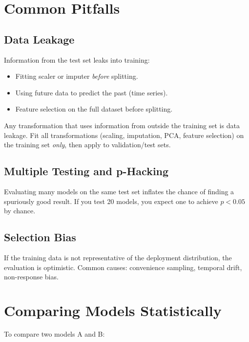 \section{Common Pitfalls}

\subsection{Data Leakage}

Information from the test set leaks into training:

\begin{itemize}
	\item Fitting scaler or imputer \emph{before} splitting.
	\item Using future data to predict the past (time series).
	\item Feature selection on the full dataset before splitting.
\end{itemize}

\begin{principle}[No Peeking]
	Any transformation that uses information from outside the training set is data leakage. Fit all transformations (scaling, imputation, PCA, feature selection) on the training set \emph{only}, then apply to validation/test sets.
\end{principle}

\subsection{Multiple Testing and p-Hacking}

Evaluating many models on the same test set inflates the chance of finding a spuriously good result. If you test 20 models, you expect one to achieve $p < 0.05$ by chance.

\subsection{Selection Bias}

If the training data is not representative of the deployment distribution, the evaluation is optimistic. Common causes: convenience sampling, temporal drift, non-response bias.

\section{Comparing Models Statistically}

To compare two models A and B:

